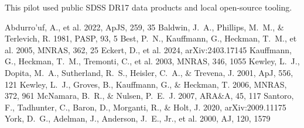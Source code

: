 \documentclass[twocolumn]{aastex631}
\begin{document}
\acknowledgments
This pilot used public SDSS DR17 data products and local open-source tooling.

\begin{thebibliography}{}
 Abdurro'uf, A., et al. 2022, ApJS, 259, 35
 Baldwin, J.~A., Phillips, M.~M., \& Terlevich, R. 1981, PASP, 93, 5
 Best, P.~N., Kauffmann, G., Heckman, T.~M., et al. 2005, MNRAS, 362, 25
 Eckert, D., et al. 2024, arXiv:2403.17145
 Kauffmann, G., Heckman, T.~M., Tremonti, C., et al. 2003, MNRAS, 346, 1055
 Kewley, L.~J., Dopita, M.~A., Sutherland, R.~S., Heisler, C.~A., \& Trevena, J. 2001, ApJ, 556, 121
 Kewley, L.~J., Groves, B., Kauffmann, G., \& Heckman, T. 2006, MNRAS, 372, 961
 McNamara, B.~R., \& Nulsen, P.~E.~J. 2007, ARA\&A, 45, 117
 Santoro, F., Tadhunter, C., Baron, D., Morganti, R., \& Holt, J. 2020, arXiv:2009.11175
 York, D.~G., Adelman, J., Anderson, J.~E., Jr., et al. 2000, AJ, 120, 1579
\end{thebibliography}
\end{document}
